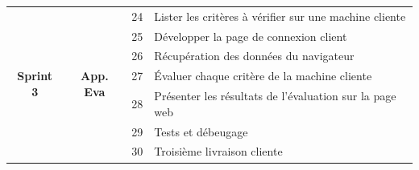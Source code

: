 \documentclass[a4paper,11pt,french]{article}
\begin{document}
\begin{tabular}{|c|c|r|l|}
\multirow{7}{*}{\begin{sideways}\textbf{Sprint 3}\end{sideways}}&\multirow{7}{*}{\textbf{App. Eva}}
&  24 & Lister les critères à vérifier sur une machine cliente\\
&& 25 & Développer la page de connexion client\\
&& 26 & Récupération des données du navigateur\\
&& 27 & Évaluer chaque critère de la machine cliente\\
&& 28 & Présenter les résultats de l'évaluation sur la page web\\
&& 29 & Tests et débeugage\\
&& 30 & Troisième livraison cliente\\\hline

\end{tabular}
\end{document}
